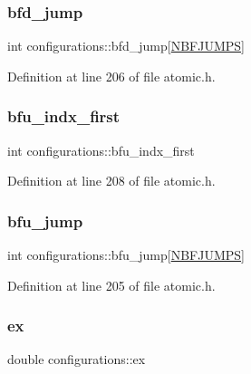 \subsubsection{\texorpdfstring{bfd\+\_\+jump}{bfd\_jump}}
{\footnotesize\ttfamily int configurations\+::bfd\+\_\+jump\mbox{[}\hyperlink{atomic_8h_a0829916f98c17313ddf806ae4a16355e}{N\+B\+F\+J\+U\+M\+PS}\mbox{]}}



Definition at line 206 of file atomic.\+h.

\mbox{\label{structconfigurations_a8942d3fe089878881187ced90e2ccc5e}} 
\subsubsection{\texorpdfstring{bfu\+\_\+indx\+\_\+first}{bfu\_indx\_first}}
{\footnotesize\ttfamily int configurations\+::bfu\+\_\+indx\+\_\+first}



Definition at line 208 of file atomic.\+h.

\mbox{\label{structconfigurations_ad7ff676cefd02052bf9ec5a92f37db98}} 
\subsubsection{\texorpdfstring{bfu\+\_\+jump}{bfu\_jump}}
{\footnotesize\ttfamily int configurations\+::bfu\+\_\+jump\mbox{[}\hyperlink{atomic_8h_a0829916f98c17313ddf806ae4a16355e}{N\+B\+F\+J\+U\+M\+PS}\mbox{]}}



Definition at line 205 of file atomic.\+h.

\mbox{\label{structconfigurations_a7759058c9db6702f3e3cefa8c2506110}} 
\subsubsection{\texorpdfstring{ex}{ex}}
{\footnotesize\ttfamily double configurations\+::ex}



